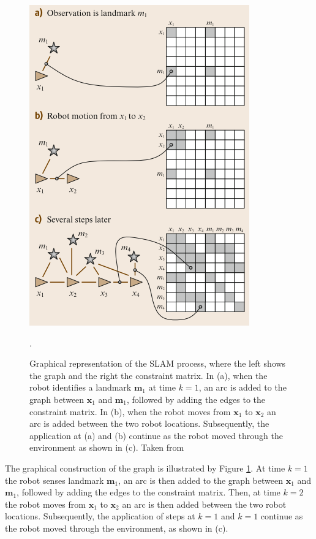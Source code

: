 \begin{figure}[H]
	\centering
	\includegraphics[width=0.7\linewidth]{"figs/graph-slam-graphical-representation"}
	
    \caption[Graphical representation of Graph SLAM]{Graphical representation of the SLAM  process, where the left shows the graph and the right the constraint matrix. In (a), when the robot identifies a landmark $\mathbf{m}_1$ at time $k = 1$, an arc is added to the graph between $\mathbf{x}_1$ and $\mathbf{m}_1$, followed by adding the edges to the constraint matrix. In (b), when the robot moves from $\mathbf{x}_1$ to $\mathbf{x}_2$ an arc is added between the two robot locations. Subsequently, the application at (a) and (b) continue as the robot moved through the environment as shown in (c). Taken from \cite{Siegwart2004}}.
	\label{fig:graph-slam-rep}
\end{figure}

The graphical construction of the graph is illustrated by Figure \ref{fig:graph-slam-rep}. At time $k = 1$ the robot senses landmark $\mathbf{m}_1$, an arc is then added to the graph between $\mathbf{x}_1$ and $\mathbf{m}_1$, followed by adding the edges to the constraint matrix. Then, at time $k = 2$ the robot moves from $\mathbf{x}_1$ to $\mathbf{x}_2$ an arc is then added between the two robot locations. Subsequently, the application of steps at $k = 1$  and $k = 1$ continue as the robot moved through the environment, as shown in (c).


